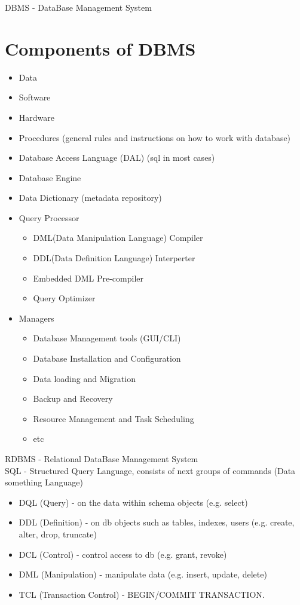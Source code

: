 \documentclass{article}
\begin{document}
    DBMS - DataBase Management System
    
    \section{Components of DBMS}
    \begin{itemize}
        \item Data
        \item Software
        \item Hardware
        \item Procedures (general rules and instructions on how to work with database)
        \item Database Access Language (DAL) (sql in most cases)
        \item Database Engine
        \item Data Dictionary (metadata repository)
        \item Query Processor \begin{itemize}
            \item DML(Data Manipulation Language) Compiler
            \item DDL(Data Definition Language) Interperter
            \item Embedded DML Pre-compiler
            \item Query Optimizer
        \end{itemize}
        \item Managers \begin{itemize}
            \item Database Management tools (GUI/CLI)
            \item Database Installation and Configuration
            \item Data loading and Migration
            \item Backup and Recovery
            \item Resource Management and Task Scheduling
            \item etc
        \end{itemize}
    \end{itemize}

    RDBMS - Relational DataBase Management System \\
    SQL - Structured Query Language, consists of next groups of commands (Data something Language)
    \begin{itemize}
        \item DQL (Query)               - on the data within schema objects (e.g. select)
        \item DDL (Definition)          - on db objects such as tables, indexes, users (e.g. create, alter, drop, truncate)
        \item DCL (Control)             - control access to db (e.g. grant, revoke)
        \item DML (Manipulation)        - manipulate data (e.g. insert, update, delete)
        \item TCL (Transaction Control) - BEGIN/COMMIT TRANSACTION.
    \end{itemize}
\end{document}
